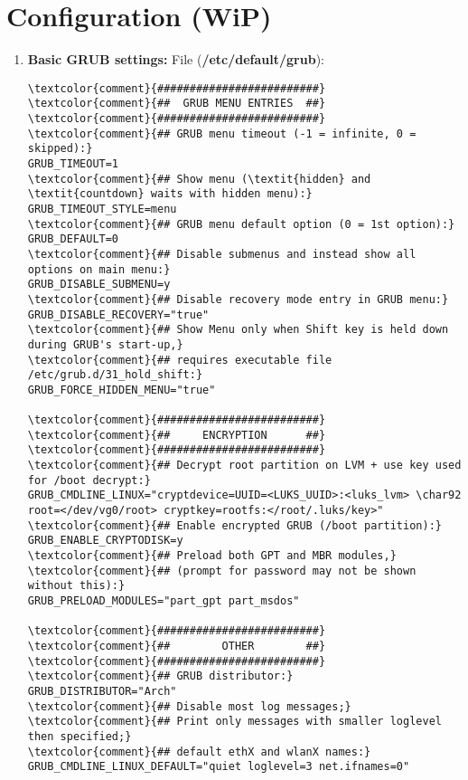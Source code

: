 \documentclass[10pt, a4paper, onecolumn, openany]{book} %
\begin{document}
\section{Configuration (WiP)}
\begin{enumerate}
    \item \textbf{Basic GRUB settings:}
\newline File (\textbf{\textcolor{file}{/etc/default/grub}}):
\begin{Verbatim}[commandchars=\\\{\}]
\textcolor{comment}{#########################}
\textcolor{comment}{##  GRUB MENU ENTRIES  ##}
\textcolor{comment}{#########################}
\textcolor{comment}{## GRUB menu timeout (-1 = infinite, 0 = skipped):}
GRUB_TIMEOUT=1
\textcolor{comment}{## Show menu (\textit{hidden} and \textit{countdown} waits with hidden menu):}
GRUB_TIMEOUT_STYLE=menu
\textcolor{comment}{## GRUB menu default option (0 = 1st option):}
GRUB_DEFAULT=0
\textcolor{comment}{## Disable submenus and instead show all options on main menu:}
GRUB_DISABLE_SUBMENU=y
\textcolor{comment}{## Disable recovery mode entry in GRUB menu:}
GRUB_DISABLE_RECOVERY="true"
\textcolor{comment}{## Show Menu only when Shift key is held down during GRUB's start-up,}
\textcolor{comment}{## requires executable file /etc/grub.d/31_hold_shift:}
GRUB_FORCE_HIDDEN_MENU="true"

\textcolor{comment}{#########################}
\textcolor{comment}{##     ENCRYPTION      ##}
\textcolor{comment}{#########################}
\textcolor{comment}{## Decrypt root partition on LVM + use key used for /boot decrypt:}
GRUB_CMDLINE_LINUX="cryptdevice=UUID=<LUKS_UUID>:<luks_lvm> \char92 
root=</dev/vg0/root> cryptkey=rootfs:</root/.luks/key>"
\textcolor{comment}{## Enable encrypted GRUB (/boot partition):}
GRUB_ENABLE_CRYPTODISK=y
\textcolor{comment}{## Preload both GPT and MBR modules,}
\textcolor{comment}{## (prompt for password may not be shown without this):}
GRUB_PRELOAD_MODULES="part_gpt part_msdos"

\textcolor{comment}{#########################}
\textcolor{comment}{##        OTHER        ##}
\textcolor{comment}{#########################}
\textcolor{comment}{## GRUB distributor:}
GRUB_DISTRIBUTOR="Arch"
\textcolor{comment}{## Disable most log messages;}
\textcolor{comment}{## Print only messages with smaller loglevel then specified;}
\textcolor{comment}{## default ethX and wlanX names:}
GRUB_CMDLINE_LINUX_DEFAULT="quiet loglevel=3 net.ifnames=0"


\end{Verbatim}
\end{enumerate}
\end{document}
